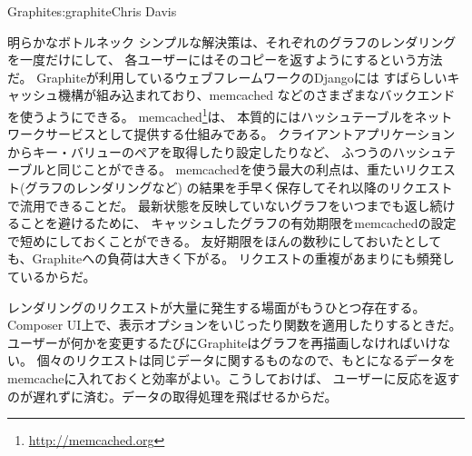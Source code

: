 \begin{aosachapter}{Graphite}{s:graphite}{Chris Davis}
\begin{aosasect1}{明らかなボトルネック}
シンプルな解決策は、それぞれのグラフのレンダリングを一度だけにして、
各ユーザーにはそのコピーを返すようにするという方法だ。
Graphiteが利用しているウェブフレームワークのDjangoには
すばらしいキャッシュ機構が組み込まれており、memcached
などのさまざまなバックエンドを使うようにできる。
memcached\footnote{\url{http://memcached.org}}は、
本質的にはハッシュテーブルをネットワークサービスとして提供する仕組みである。
クライアントアプリケーションからキー・バリューのペアを取得したり設定したりなど、
ふつうのハッシュテーブルと同じことができる。
memcachedを使う最大の利点は、重たいリクエスト(グラフのレンダリングなど)
の結果を手早く保存してそれ以降のリクエストで流用できることだ。
最新状態を反映していないグラフをいつまでも返し続けることを避けるために、
キャッシュしたグラフの有効期限をmemcachedの設定で短めにしておくことができる。
友好期限をほんの数秒にしておいたとしても、Graphiteへの負荷は大きく下がる。
リクエストの重複があまりにも頻発しているからだ。

レンダリングのリクエストが大量に発生する場面がもうひとつ存在する。
Composer UI上で、表示オプションをいじったり関数を適用したりするときだ。
ユーザーが何かを変更するたびにGraphiteはグラフを再描画しなければいけない。
個々のリクエストは同じデータに関するものなので、もとになるデータを
memcacheに入れておくと効率がよい。こうしておけば、
ユーザーに反応を返すのが遅れずに済む。データの取得処理を飛ばせるからだ。


\end{aosasect1}
\end{aosachapter}
